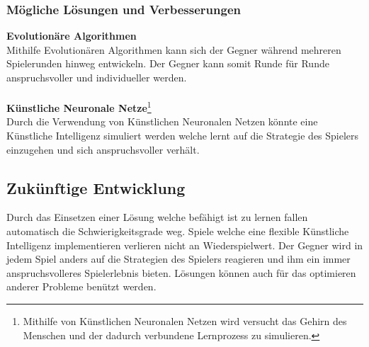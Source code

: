 \subsubsection{Mögliche Lösungen und Verbesserungen}
\textbf{Evolutionäre Algorithmen}
\\
Mithilfe Evolutionären Algorithmen kann sich der Gegner während mehreren Spielerunden hinweg entwickeln. Der Gegner kann somit Runde für Runde anspruchsvoller und individueller werden.
\\\\
\textbf{Künstliche Neuronale Netze}\footnote{Mithilfe von Künstlichen Neuronalen Netzen wird versucht das Gehirn des Menschen und der dadurch verbundene Lernprozess zu simulieren.}
\\
Durch die Verwendung von Künstlichen Neuronalen Netzen könnte eine Künstliche Intelligenz simuliert werden welche lernt auf die Strategie des
Spielers einzugehen und sich anspruchsvoller verhält.
\subsection{Zukünftige Entwicklung}
Durch das Einsetzen einer Lösung welche befähigt ist zu lernen fallen automatisch die Schwierigkeitsgrade weg. Spiele welche eine flexible Künstliche Intelligenz implementieren verlieren nicht an Wiederspielwert. Der Gegner wird in jedem Spiel anders auf die Strategien des Spielers reagieren und ihm ein immer anspruchsvolleres Spielerlebnis bieten. Lösungen können auch für das optimieren anderer Probleme benützt werden.